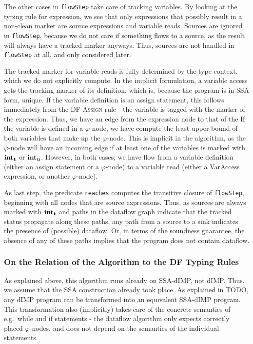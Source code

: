 The other cases in \texttt{flowStep} take care of tracking variables.
By looking at the typing rule for expression, we see that only expressions that possibly 
result in a non-clean marker are source expressions and variable reads.
Sources are ignored in \texttt{flowStep}, because we do not care
if something flows to a source, as the result will always have a tracked marker anyways.
Thus, sources are not handled in \texttt{flowStep} at all, and only considered later.

The tracked marker for variable reads is fully determined by the type context,
which we do not explicitly compute.
In the implicit formulation, a variable access gets the tracking marker of its definition,
which is, because the program is in SSA form, unique.
If the variable definition is an assign statement, this follows immediately from the
\textsc{DF-Assign} rule - the variable is tagged with the marker of the expression.
Thus, we have an edge from the expression node to that of the 
If the variable is defined in a $\varphi$-node, we have compute the least upper bound of 
both variables that make up the $\varphi$-node.
This is implicit in the algorithm, as the $\varphi$-node will have an incoming edge if 
at least one of the variables is marked with $\textbf{int}_\textbf{t}$ or $\textbf{int}_\textbf{u}$.
However, in both cases, we have flow from a variable definition (either an assign
statement or a $\varphi$-node) to a variable read (either a VarAccess expression, 
or another $\varphi$-node).

As last step, the predicate \texttt{reaches}
computes the transitive closure of \texttt{flowStep}, beginning with all nodes
that are source expressions.
Thus, as sources are always marked with $\textbf{int}_\textbf{t}$ and paths in the dataflow
graph indicate that the tracked status propagate along these paths, any path 
from a source to a sink indicates the presence of (possible) dataflow.
Or, in terms of the soundness guarantee, the absence of any of these paths 
implies that the program does not contain dataflow.

\subsubsection*{On the Relation of the Algorithm to the DF Typing Rules}
As explained above, this algorithm runs already on SSA-dIMP, not dIMP.
Thus, we assume that the SSA construction already took place.
As explained in TODO, any dIMP program can be transformed into an equivalent
SSA-dIMP program.
This transformation also (implicitly) takes care of the concrete semantics of e.g.\ 
while and if statements - the dataflow algorithm only expects correctly placed $\varphi$-nodes,
and does not depend on the semantics of the individual statements.

